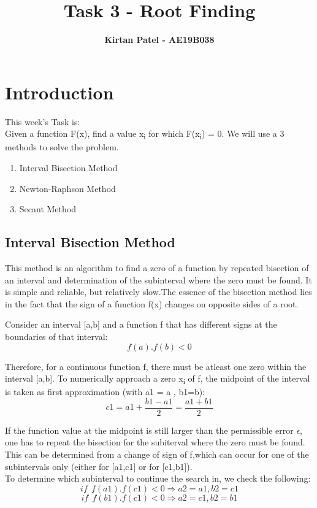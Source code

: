 \documentclass[11pt]{article}
\title{\LARGE{\bf{Task 3 - Root Finding}}}
\author{\Large{\bf{Kirtan Patel - AE19B038}}}
\date{}
\begin{document}
\maketitle 

\section{Introduction}
This week's Task is:\\
Given a function F(x), find a value x\textsubscript{i} for which F(x\textsubscript{i}) = 0. We will use a 3 methods to solve the problem. 
\begin{enumerate}
	\item Interval Bisection Method
	\item Newton-Raphson Method
	\item Secant Method
\end{enumerate}

\subsection{Interval Bisection Method}
This method is an algorithm to find a zero of a function by repeated bisection of an interval and determination of the subinterval where the zero must be found. It is simple and reliable, but relatively slow.The essence of the bisection method lies in the fact that the sign of a function f(x) changes on opposite sides of a root.

Consider an interval [a,b] and a function f that has different signs at the boundaries of that interval: \[f(a).f(b)<0\]

Therefore, for a continuous function f, there must be atleast one zero within the interval [a,b]. To numerically approach a zero x\textsubscript{i} of f, the midpoint of the interval is taken as first approximation (with a1 = a , b1=b):
\[ c1 = a1 + \frac{b1-a1}{2} = \frac{a1 + b1}{2}\]

If the function value at the midpoint is still larger than the permissible error $\epsilon$, one has to repeat the bisection for the subiterval where the zero must be found. This can be determined from a change of sign of f,which can occur for one of the subintervals only (either for [a1,c1] or for [c1,b1]).\\

To determine which subinterval to continue the search in, we check the following:
\[if~~f(a1).f(c1)<0 \Rightarrow a2=a1, b2=c1\]
\[if~~f(b1).f(c1)<0 \Rightarrow a2=c1, b2=b1\]
\end{document}
